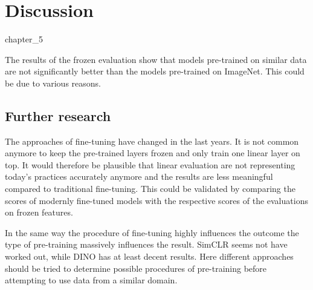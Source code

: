 \chapter{Discussion}{chapter_5}

The results of the frozen evaluation show that models pre-trained on similar data are not significantly better than the models pre-trained on ImageNet. This could be due to various reasons.

\section{Further research}
The approaches of fine-tuning have changed in the last years. It is not common anymore to keep the pre-trained layers frozen and only train one linear layer on top. 
It would therefore be plausible that linear evaluation are not representing today's practices accurately anymore and the results are less meaningful compared to traditional fine-tuning.
This could be validated by comparing the scores of modernly fine-tuned models with the respective scores of the evaluations on frozen features.

In the same way the procedure of fine-tuning highly influences the outcome the type of pre-training massively influences the result. SimCLR seems not have worked out, while DINO has at least decent results. 
Here different approaches should be tried to determine possible procedures of pre-training before attempting to use data from a similar domain.

















